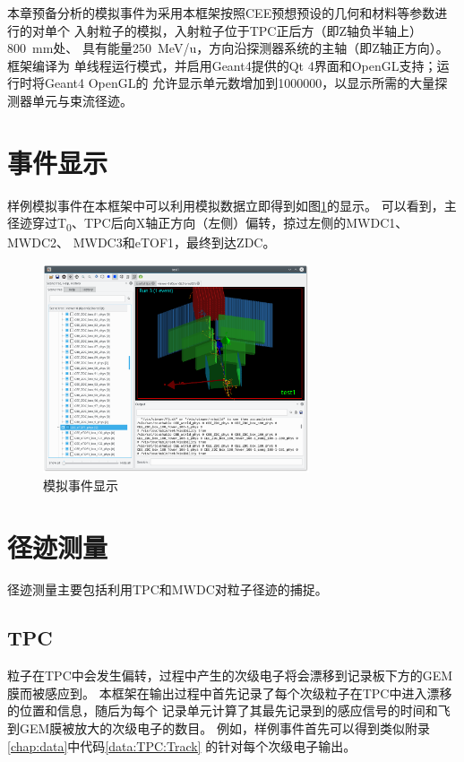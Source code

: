 \documentclass[bachelor,openany,oneside,color]{buaathesis}
\def\TZ{T\textsubscript{0}}
\begin{document}
本章预备分析的模拟事件为采用本框架按照CEE预想预设的几何和材料等参数进行的对单个
入射粒子的模拟，入射粒子位于TPC正后方（即Z轴负半轴上）\SI{800}{\milli\meter}处、
具有能量\SI{250}{\mega\eV/u}，方向沿探测器系统的主轴（即Z轴正方向）。框架编译为
单线程运行模式，并启用Geant4提供的Qt 4界面和OpenGL支持；运行时将Geant4 OpenGL的
允许显示单元数增加到1000000，以显示所需的大量探测器单元与束流径迹。

\section{事件显示}

样例模拟事件在本框架中可以利用模拟数据立即得到如图\ref{fig:EventDisplay}的显示。
可以看到，主径迹穿过\TZ、TPC后向X轴正方向（左侧）偏转，掠过左侧的MWDC1、MWDC2、
MWDC3和eTOF1，最终到达ZDC。

\begin{figure}
	\centering
	\includegraphics[width=0.7\textwidth]{./resource/EventDisplay.png}
	\caption{模拟事件显示}\label{fig:EventDisplay}
\end{figure}

\section{径迹测量}

径迹测量主要包括利用TPC和MWDC对粒子径迹的捕捉。

\subsection{TPC}

粒子在TPC中会发生偏转，过程中产生的次级电子将会漂移到记录板下方的GEM膜而被感应到。
本框架在输出过程中首先记录了每个次级粒子在TPC中进入漂移的位置和信息，随后为每个
记录单元计算了其最先记录到的感应信号的时间和飞到GEM膜被放大的次级电子的数目。
例如，样例事件首先可以得到类似附录\ref{chap:data}中代码\ref{data:TPC:Track}
的针对每个次级电子输出。
\end{document}
